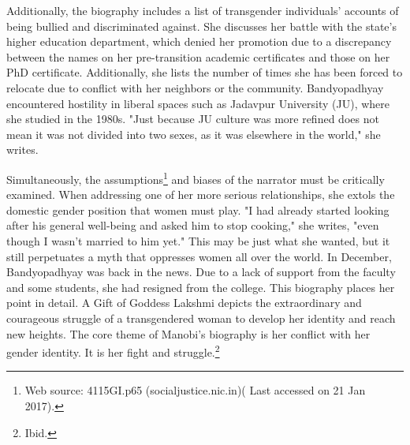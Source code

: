 \begin{multicols}{2}
\noi
Additionally, the biography includes a list of transgender individuals' accounts of being bullied
and discriminated against. She discusses her battle with the state's higher education department,
which denied her promotion due to a discrepancy between the names on her pre-transition
academic certificates and those on her PhD certificate. Additionally, she lists the number of
times she has been forced to relocate due to conflict with her neighbors or the community.
Bandyopadhyay encountered hostility in liberal spaces such as Jadavpur University (JU), where
she studied in the 1980s. "Just because JU culture was more refined does not mean it was not
divided into two sexes, as it was elsewhere in the world," she writes.


\noi
Simultaneously, the assumptions\footnote{Web source: 4115GI.p65 (socialjustice.nic.in)( Last accessed on 21 Jan 2017).} and biases of the narrator must be critically examined. When addressing one of her more serious relationships, she extols the domestic gender position that women must play. "I had already started looking after his general well-being and asked him to stop cooking," she writes, "even though I wasn't married to him yet." This may be just what she wanted, but it still perpetuates a myth that oppresses women all over the world. In December, Bandyopadhyay was back in the news. Due to a lack of support from the faculty and some students, she had resigned from the college. This biography places her point in detail. A Gift of Goddess Lakshmi depicts the extraordinary and courageous struggle of a
transgendered woman to develop her identity and reach new heights. The core theme of
Manobi's biography is her conflict with her gender identity. It is her fight and struggle.\footnote{Ibid.}

\end{multicols}
	
\label{end2017-art4}

